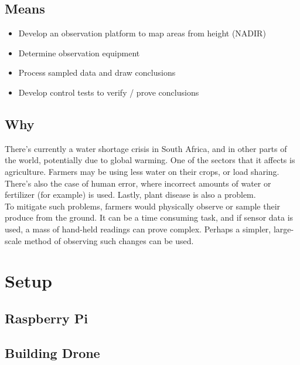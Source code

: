 \subsection{Means}

\begin{itemize}
    \item Develop an observation platform to map areas from height (NADIR)
    \item Determine observation equipment
    \item Process sampled data and draw conclusions
    \item Develop control tests to verify / prove conclusions
\end{itemize}

\subsection{Why}

There's currently a water shortage crisis in South Africa, and in other parts of the world, potentially due to global warming. One of the sectors that it affects is agriculture. Farmers may be using less water on their crops, or load sharing. There's also the case of human error, where incorrect amounts of water or fertilizer (for example) is used. Lastly, plant disease is also a problem.\\

To mitigate such problems, farmers would physically observe or sample their produce from the ground. It can be a time consuming task, and if sensor data is used, a mass of hand-held readings can prove complex. Perhaps a simpler, large-scale method of observing such changes can be used.

\section{Setup}

\subsection{Raspberry Pi}
\subsection{Building Drone}

